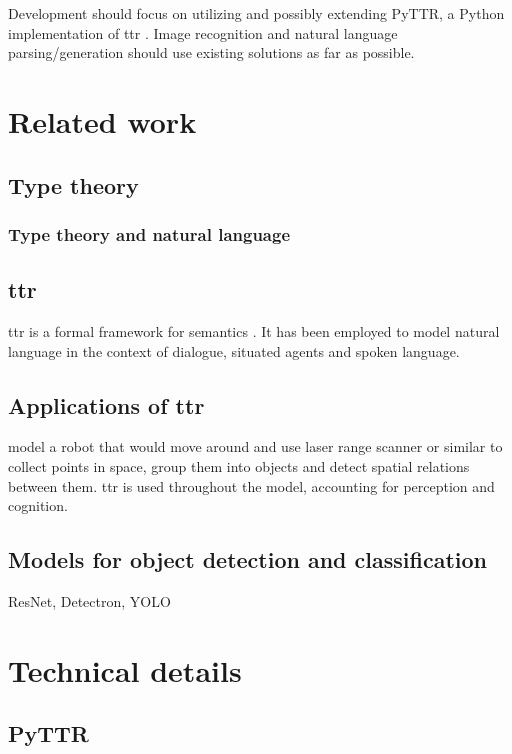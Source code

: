 \documentclass[11pt, a4paper]{article}
\begin{document}
\noindent
Development should focus on utilizing and possibly extending PyTTR, a Python implementation of \gls{ttr} \citep{pyttr}. Image recognition and natural language parsing/generation should use existing solutions as far as possible.

\section{Related work}

\subsection{Type theory}

\subsubsection{Type theory and natural language}

\subsection{\gls{ttr}}

\gls{ttr} is a formal framework for semantics \citep{CooperRecordsRecordTypes2005}.
It has been employed to model natural language in the context of dialogue, situated agents and spoken language.

\subsection{Applications of \gls{ttr}}

\cite{DobnikModellinglanguageaction2012} model a robot that would move around and use laser range scanner or similar to collect points in space, group them into objects and detect spatial relations between them.
\Gls{ttr} is used throughout the model, accounting for perception and cognition.

\subsection{Models for object detection and classification}

ResNet, Detectron, YOLO

\section{Technical details}


\subsection{PyTTR}
\end{document}
